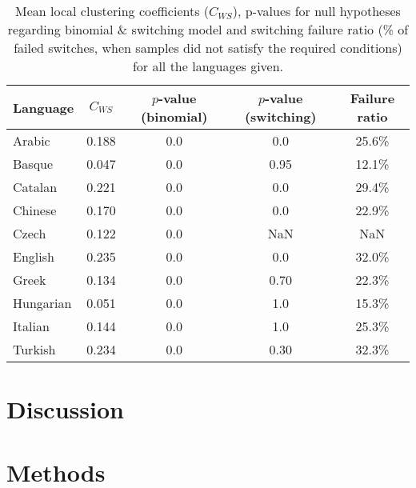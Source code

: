 \documentclass{article}
\begin{document}
\begin{table}[ht]
\centering
\begin{tabular}{lcccc}
\hline
Language & $C_{WS}$ & $p$-value (binomial) & $p$-value (switching) & Failure ratio \\
\hline
Arabic & 0.188 & 0.0 & 0.0 & 25.6\% \\
Basque & 0.047 & 0.0 & 0.95 & 12.1\% \\
Catalan & 0.221 & 0.0 & 0.0 & 29.4\% \\
Chinese & 0.170 & 0.0 & 0.0 & 22.9\% \\
Czech & 0.122 & 0.0 & NaN & NaN \\
English & 0.235 & 0.0 & 0.0 & 32.0\% \\
Greek & 0.134 & 0.0 & 0.70 & 22.3\% \\
Hungarian & 0.051 & 0.0 & 1.0 & 15.3\% \\
Italian & 0.144 & 0.0 & 1.0 & 25.3\% \\
Turkish & 0.234 & 0.0 & 0.30 & 32.3\% \\
\hline
\end{tabular}
\caption{Mean local clustering coefficients ($C_{WS}$), p-values for null hypotheses regarding binomial \& switching model and switching failure ratio (\% of failed switches, when samples did not satisfy the required conditions) for all the languages given.}
\label{pvals}
\end{table}



\section{Discussion}



\section{Methods}
\end{document}
